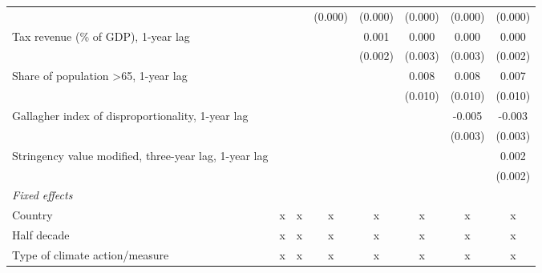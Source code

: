 \begin{tabular}{lccccccc}
                                                                      &                &               & (0.000)        & (0.000)       & (0.000)       & (0.000)       & (0.000)\\   
   Tax revenue (\% of GDP), 1-year lag                                &                &               &                & 0.001         & 0.000         & 0.000         & 0.000\\   
                                                                      &                &               &                & (0.002)       & (0.003)       & (0.003)       & (0.002)\\   
   Share of population >65, 1-year lag                                &                &               &                &               & 0.008         & 0.008         & 0.007\\   
                                                                      &                &               &                &               & (0.010)       & (0.010)       & (0.010)\\   
   Gallagher index of disproportionality, 1-year lag                  &                &               &                &               &               & -0.005        & -0.003\\   
                                                                      &                &               &                &               &               & (0.003)       & (0.003)\\   
   Stringency value modified, three-year lag, 1-year lag              &                &               &                &               &               &               & 0.002\\   
                                                                      &                &               &                &               &               &               & (0.002)\\   
   \emph{Fixed effects}\\
   Country                                                            & x              & x             & x              & x             & x             & x             & x\\  
   Half decade                                                        & x              & x             & x              & x             & x             & x             & x\\  
   Type of climate action/measure                                     & x              & x             & x              & x             & x             & x             & x\\  

\end{tabular}
